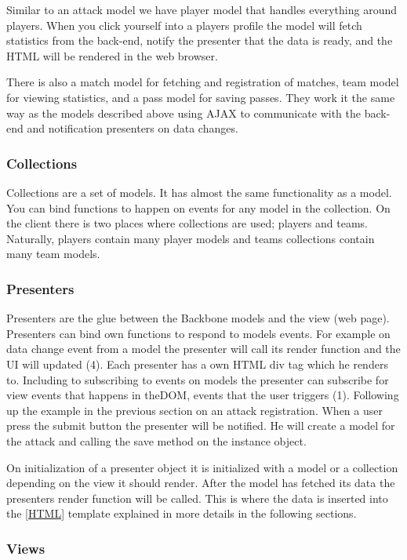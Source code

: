 Similar to an attack model we have player model that handles everything around players. When you click yourself into a players profile the model will fetch statistics from the back-end, notify the presenter that the data is ready, and the \ac{HTML} will be rendered in the web browser.

There is also a match model for fetching and registration of matches, team model for viewing statistics, and a pass model for saving passes. They work it the same way as the models described above using \ac{AJAX} to communicate with the back-end and notification presenters on data changes.

\subsubsection{Collections}
Collections are a set of models. It has almost the same functionality as a model. You can bind functions to happen on events for any model in the collection. On the client there is two places where collections are used; players and teams. Naturally, players contain many player models and teams collections contain many team models.

\subsubsection{Presenters}

Presenters are the glue between the Backbone models and the view (web page).  Presenters can bind own functions to respond to models events. For example on data change event from a model the presenter will call its render function and the \ac{UI} will updated (4). Each presenter has a own \ac{HTML} div tag which he renders to. Including to subscribing to events on models the presenter can subscribe for view events that happens in the\ac{DOM}, events that the user triggers (1). Following up the example in the previous section on an attack registration. When a user press the submit button the presenter will be notified. He will create a model for the attack and calling the save method on the instance object. 

On initialization of a presenter object it is initialized with a model or a collection depending on the view it should render.  After the model has fetched its data the presenters render function will be called. This is where the data is inserted into the \ref{HTML} template explained in more details in the following sections.

\subsubsection{Views}

